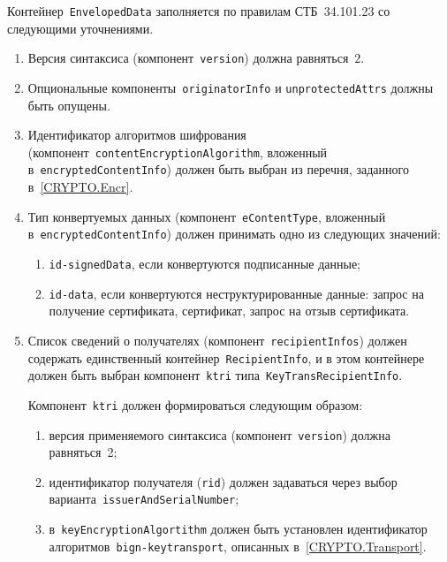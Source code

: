 Контейнер~\texttt{EnvelopedData} заполняется по правилам СТБ~34.101.23
со следующими уточнениями.

\begin{enumerate}
\item
Версия синтаксиса (компонент~\texttt{version}) должна равняться~$2$. 

\item
Опциональные компоненты~\texttt{originatorInfo} и 
\texttt{unprotectedAttrs} должны быть опущены. 

\item
Идентификатор алгоритмов шифрования 
(компонент~\texttt{contentEncryptionAlgorithm}, вложенный  
в~\texttt{encryptedContentInfo}) должен быть выбран из перечня, 
заданного в~\ref{CRYPTO.Encr}.

\item
Тип конвертуемых данных (компонент~\texttt{eContentType}, вложенный 
в~\texttt{encryptedContentInfo}) должен принимать одно из следующих значений:
\begin{enumerate}
\item
\texttt{id-signedData}, если конвертуются подписанные данные;
\item
\texttt{id-data}, если конвертуются неструктурированные данные:
запрос на получение сертификата, сертификат, запрос на отзыв сертификата.
\end{enumerate}

\item
Список сведений о получателях (компонент~\texttt{recipientInfos})
должен содержать единственный контейнер~\texttt{RecipientInfo}, 
и в этом контейнере должен быть выбран компонент~\texttt{ktri} 
типа~\texttt{KeyTransRecipientInfo}. 

Компонент~\texttt{ktri} должен формироваться следующим образом:
\begin{enumerate}
\item
версия применяемого синтаксиса (компонент~\texttt{version})
должна равняться~2;
\item
идентификатор получателя (\texttt{rid}) должен задаваться через выбор 
варианта~\texttt{issuerAndSerialNumber};
\item
в~\texttt{keyEncryptionAlgortithm} должен быть установлен идентификатор
алгоритмов~\texttt{bign-keytransport}, описанных в~\ref{CRYPTO.Transport}.
\end{enumerate}
\end{enumerate}